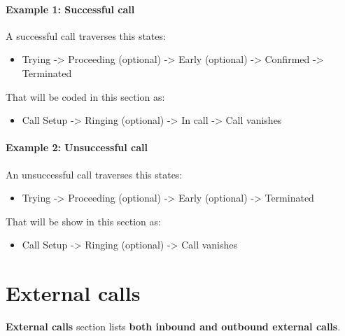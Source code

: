 \documentclass[letterpaper,10pt,english]{sphinxmanual}
\begin{document}
\paragraph{Example 1: Successful call}

A successful call traverses this states:
\begin{itemize}
\item {} 
Trying -\textgreater{} Proceeding (optional) -\textgreater{} Early (optional) -\textgreater{} Confirmed -\textgreater{} Terminated

\end{itemize}

That will be coded in this section as:
\begin{itemize}
\item {} 
Call Setup -\textgreater{} Ringing (optional) -\textgreater{} In call -\textgreater{} Call vanishes

\end{itemize}
\paragraph{Example 2: Unsuccessful call}

An unsuccessful call traverses this states:
\begin{itemize}
\item {} 
Trying -\textgreater{} Proceeding (optional) -\textgreater{} Early (optional) -\textgreater{} Terminated

\end{itemize}

That will be show in this section as:
\begin{itemize}
\item {} 
Call Setup -\textgreater{} Ringing (optional) -\textgreater{} Call vanishes

\end{itemize}
\label{administration_portal/platform/external_calls:external-calls}

\section{External calls}
\label{administration_portal/platform/external_calls:id2}\label{administration_portal/platform/external_calls:external-calls}\label{administration_portal/platform/external_calls::doc}\label{administration_portal/platform/external_calls:id1}
\textbf{External calls} section lists \textbf{both inbound and outbound external calls}.
\end{document}
